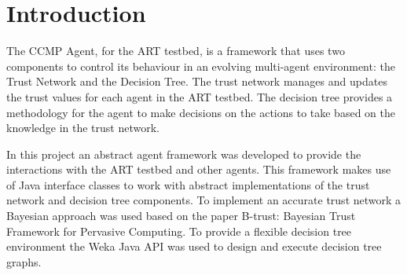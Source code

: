 \section{Introduction}
The CCMP Agent, for the ART testbed, is a framework that uses two components to
control its behaviour in an evolving multi-agent environment: the Trust Network
and the Decision Tree.  The trust network manages and updates the trust values
for each agent in the ART testbed. The decision tree provides a methodology for
the agent to make decisions on the actions to take based on the knowledge in the
trust network. 

In this project an abstract agent framework was developed to provide the
interactions with the ART testbed and other agents.  This framework makes use
of Java interface classes to work with abstract implementations of the trust
network and decision tree components.  To implement an accurate trust network a
Bayesian approach was used based on the paper B-trust: Bayesian Trust Framework
for Pervasive Computing.  To provide a flexible decision tree environment the Weka Java API
was used to design and execute decision tree graphs.